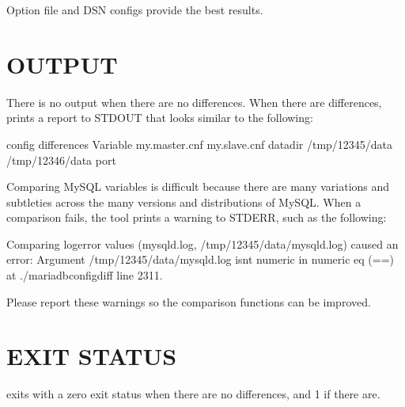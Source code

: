 \documentclass[letterpaper,10pt,english]{sphinxmanual}
\begin{document}
\sphinxAtStartPar
Option file and DSN configs provide the best results.


\section{OUTPUT}
\label{\detokenize{mariadb-config-diff:output}}
\sphinxAtStartPar
There is no output when there are no differences.  When there are differences,
 prints a report to STDOUT that looks similar to the following:

\begin{sphinxVerbatim}[commandchars=\\\{\}]
 config differences
Variable                  my.master.cnf   my.slave.cnf
  
datadir                   /tmp/12345/data /tmp/12346/data
port                                 
\end{sphinxVerbatim}

\sphinxAtStartPar
Comparing MySQL variables is difficult because there are many variations and
subtleties across the many versions and distributions of MySQL.  When a
comparison fails, the tool prints a warning to STDERR, such as the following:

\begin{sphinxVerbatim}[commandchars=\\\{\}]
Comparing log\PYGZus{}error values (mysqld.log, /tmp/12345/data/mysqld.log)
caused an error: Argument \PYGZdq{}/tmp/12345/data/mysqld.log\PYGZdq{} isn\PYGZsq{}t numeric
in numeric eq (==) at ./mariadb\PYGZhy{}config\PYGZhy{}diff line 2311.
\end{sphinxVerbatim}

\sphinxAtStartPar
Please report these warnings so the comparison functions can be improved.


\section{EXIT STATUS}
\label{\detokenize{mariadb-config-diff:exit-status}}
\sphinxAtStartPar
{} exits with a zero exit status when there are no differences, and
1 if there are.
\end{document}
